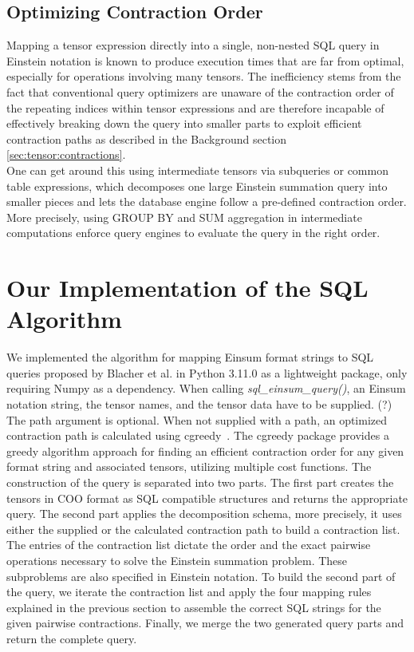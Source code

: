\subsection{Optimizing Contraction Order}
Mapping a tensor expression directly into a single, non-nested SQL query in Einstein
notation is known to produce execution times that are far from optimal, especially for operations
involving many tensors. The inefficiency stems from the fact that conventional query optimizers
are unaware of the contraction order of the repeating indices within tensor expressions and are
therefore incapable of effectively breaking down the query into smaller parts to exploit efficient
contraction paths as described in the Background section \ref{sec:tensor:contractions}.\\
One can get around this using intermediate tensors via subqueries or common table expressions,
which decomposes one large Einstein summation query into smaller pieces and lets the database
engine follow a pre-defined contraction order. More precisely, using GROUP BY and SUM
aggregation in intermediate computations enforce query engines to evaluate the query in the
right order.

\section{Our Implementation of the SQL Algorithm}
We implemented the algorithm for mapping Einsum format strings to SQL queries proposed by Blacher
et al. in Python 3.11.0 as a lightweight package, only requiring Numpy as a dependency. When
calling \textit{sql\_einsum\_query()}, an Einsum notation string, the tensor names, and the tensor
data have to be supplied. (?) The path argument is optional. When not supplied with a path, an
optimized contraction path is calculated using cgreedy~\cite{cgreedy}. The cgreedy package
provides a greedy algorithm approach for finding an efficient contraction order for any given
format string and associated tensors, utilizing multiple cost functions. The construction of the
query is separated into two parts. The first part creates the tensors in COO format as SQL
compatible structures and returns the appropriate query. The second part applies the decomposition
schema, more precisely, it uses either the supplied or the calculated contraction path to build a
contraction list. The entries of the contraction list dictate the order and the exact pairwise
operations necessary to solve the Einstein summation problem. These subproblems are also specified
in Einstein notation. To build the second part of the query, we iterate the contraction list and
apply the four mapping rules explained in the previous section to assemble the correct SQL
strings for the given pairwise contractions. Finally, we merge the two generated query parts and
return the complete query.
